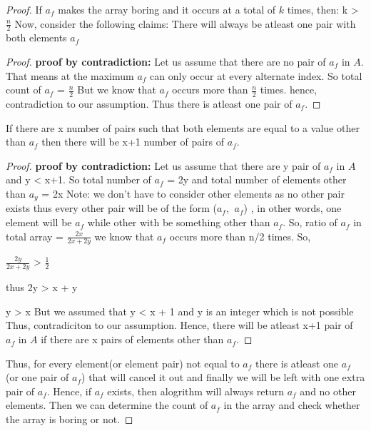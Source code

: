 \documentclass[11pt]{article}
\begin{document}
\begin{proof}
If $a_f$ makes the array boring and it occurs at a total of $k$ times, then: \newline
k > $\frac{n}{2}$ \newline
Now, consider the following claims: \newline
{} There will always be atleast one pair with both elements $a_f$
\begin{proof}
{\bf proof by contradiction:} Let us assume that there are no pair of $a_f$ in $A$. That means at the maximum $a_f$ can only
occur at every alternate index. So total count of $a_f$ = $\frac{n}{2}$ \newline
But we know that $a_f$ occurs more than $\frac{n}{2}$ times. hence, contradiction to our assumption. Thus there is atleast one 
pair of $a_f$.
\end{proof}
 If there are x number of pairs such that both elements are equal to a value other than $a_f$
then there will be x+1 number of pairs of $a_f$.
\begin{proof}
{\bf proof by contradiction:} Let us assume that there are y pair of $a_f$ in $A$ and y < x+1.  \newline
So total number of $a_f$ = 2y \newline
and total number of elements other than $a_y$ = 2x \newline
Note: we don't have to consider other elements as no other pair exists thus every other pair will be of the form ($a_f$, $~a_f$)
, in  other words, one element will be $a_f$ while other with be something other than $a_f$. \newline
So,  ratio of $a_f$ in total array = $\frac{2x}{2x+2y}$ \newline
we know that $a_f$ occurs more than n/2 times. So, \newline

$\frac{2y}{2x+2y}$  > $\frac{1}{2}$

thus 2y > x + y \newline

y > x But we assumed that y < x + 1 and y is an integer which is not possible \newline
Thus, contradiciton to our assumption. \newline
Hence, there will be atleast x+1 pair of $a_f$ in $A$ if there are x pairs of elements other than $a_f$.
\end{proof}
Thus, for every element(or element pair) not equal to  $a_f$ there is atleast one $a_f$ (or one pair of $a_f$) that will cancel it out and
finally we will be left with one extra pair of $a_f$. \newline
Hence, if $a_f$ exists, then alogrithm will always return $a_f$ and no other elements.
Then we can determine the count of $a_f$ in the array and check whether  the array is boring or not.
\end{proof}
\end{document}
